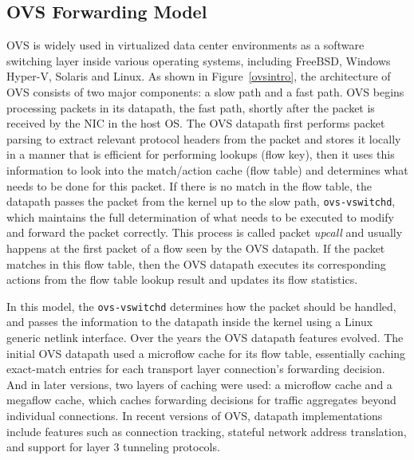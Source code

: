 \documentclass[10pt,numbers,reprint]{sigplanconf}
\begin{document}
\subsection{OVS Forwarding Model}
OVS is widely used in virtualized data center environments as a software
switching layer inside various operating systems, including FreeBSD,
Windows Hyper-V, Solaris and Linux. As shown in
Figure~\ref{ovsintro}, the architecture of OVS consists of two major
components: a slow path and a fast path. OVS begins processing packets
in its datapath, the fast path, shortly after the packet is received by the NIC in the host OS.
The OVS datapath first performs packet parsing to extract relevant protocol
headers from the packet and stores it locally in a manner that is efficient for
performing lookups (flow key), then it uses this information to look into the
match/action cache (flow table) and determines what needs to be done for this
packet. If there is no match in the flow table, the datapath passes the packet
from the kernel up to the slow path, \verb+ovs-vswitchd+, which maintains the
full determination of what needs to be executed to modify and forward
the packet correctly.  This process is called packet {\em upcall} and
usually happens at the first packet of a flow seen by the OVS datapath.
If the packet matches in this flow table, then the OVS datapath executes its
corresponding actions from the flow table lookup result and updates its flow
statistics.

In this model, the \verb+ovs-vswitchd+ determines how the packet should be handled,
and passes the information to the datapath inside the kernel using a
Linux generic netlink interface.  Over the years the OVS datapath features evolved.
The initial OVS datapath used a microflow cache for its flow table,
essentially caching exact-match entries for each
transport layer connection's forwarding decision.  And in later versions,
two layers of caching were used: a microflow cache and a megaflow cache,
which caches forwarding decisions for traffic aggregates beyond individual
connections.  In recent versions of OVS, datapath implementations include
features such as connection tracking, stateful network address translation, and
support for layer 3 tunneling protocols.
\end{document}
